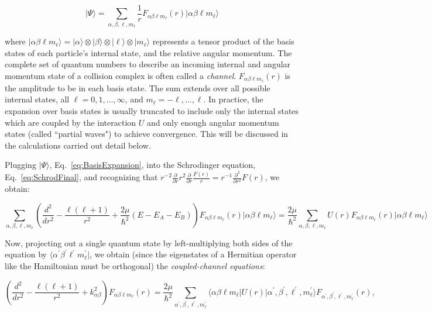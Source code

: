 \documentclass[%
 reprint,
 amsmath,amssymb,
 aps,
 nofootinbib
]{revtex4-1}
\begin{document}
\begin{equation}
\lvert \Psi \rangle =  \sum_{\alpha,\beta,\ell,m_\ell} \frac{1}{r} F_{\alpha \beta \ell m_\ell}(r) \lvert \alpha \beta \ell m_\ell \rangle
\label{eq:BasisExpansion}
\end{equation}

\noindent where $\lvert \alpha \beta \ell m_\ell \rangle = \lvert \alpha \rangle \otimes \lvert \beta \rangle \otimes \lvert \ell \rangle \otimes \lvert m_\ell \rangle$ represents a tensor product of the basis states of each particle's internal state, and the relative angular momentum. The complete set of quantum numbers to describe an incoming internal and angular momentum state of a collision complex is often called a \textit{channel}. $F_{\alpha \beta \ell m_\ell}(r)$ is the amplitude to be in each basis state. The sum extends over all possible internal states, all $\ell = 0, 1, ..., \infty$, and $m_\ell = -\ell, ..., \ell$. In practice, the expansion over basis states is usually truncated to include only the internal states which are coupled by the interaction $U$ and only enough angular momentum states (called ``partial waves") to achieve convergence. This will be discussed in the calculations carried out detail below. 

Plugging $\lvert \Psi \rangle$, Eq.~\ref{eq:BasisExpansion}, into the Schrodinger equation, Eq.~\ref{eq:SchrodFinal}, and recognizing that $r^{-2} \frac{\partial}{\partial r} r^2 \frac{\partial}{\partial r} \frac{F(r)}{r} = r^{-1} \frac{\partial^2}{\partial r^2} F(r)$, we obtain:

\begin{widetext}
\[
\sum_{\alpha,\beta,\ell,m_\ell} \left(\frac{d^2}{dr^2} - \frac{\ell(\ell+1)}{r^2} + \frac{2 \mu}{\hbar^2}(E-E_A-E_B) \right) F_{\alpha \beta \ell m_\ell}(r)  \lvert \alpha \beta \ell m_\ell \rangle = \frac{2 \mu}{\hbar^2} \sum_{\alpha,\beta,\ell,m_\ell} U(r) F_{\alpha \beta \ell m_\ell}(r)  \lvert \alpha \beta \ell m_\ell \rangle 
\]
\end{widetext}

\noindent Now, projecting out a single quantum state by left-multiplying both sides of the equation by $\langle \alpha^\prime \beta^\prime \ell^\prime m_\ell^\prime \rvert$, we obtain (since the eigenstates of a Hermitian operator like the Hamiltonian must be orthogonal) the \textit{coupled-channel equations}:
\begin{widetext}
\[
 \left(\frac{d^2}{dr^2} - \frac{\ell(\ell+1)}{r^2} + k_{\alpha \beta}^2 \right) F_{\alpha \beta \ell m_\ell}(r) = \frac{2 \mu}{\hbar^2} \sum_{\alpha^\prime,\beta^\prime,\ell^\prime,m_\ell^\prime} \langle \alpha \beta \ell m_\ell \rvert U(r)   \lvert \alpha^\prime,\beta^\prime,\ell^\prime,m_\ell^\prime \rangle F_{\alpha^\prime,\beta^\prime,\ell^\prime,m_\ell^\prime}(r),
 \]
\end{widetext}
\end{document}
